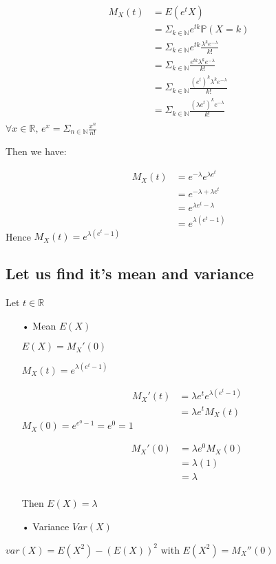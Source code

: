 \documentclass[11pt]{article}
\begin{document}
  
  \begin{align*}
M_X(t)&=E(e^tX)\\
	&=\Sigma_{k\in \mathbb{N}  }e^{tk}\mathbb{P}(X=k)  \\
	&=\Sigma_{k\in \mathbb{N}  }e^{tk}\frac{\lambda^{k} e^{-\lambda}}{k!}  \\
	&=\Sigma_{k\in \mathbb{N}  }\frac{e^{tk}\lambda^{k} e^{-\lambda}}{k!}  \\
	 &=\Sigma_{k\in \mathbb{N}  }\frac{(e^{t})^k\lambda^{k} e^{-\lambda}}{k!}  \\
	 &=\Sigma_{k\in \mathbb{N}  }\frac{(\lambda e^{t})^k e^{-\lambda}}{k!}  \\
\end{align*}
$\forall x \in \mathbb{R}\text{, } e^x= \Sigma_{n\in \mathbb{N}  }\frac{x^{n}}{n!}$

Then we have:

\begin{align*}
M_X(t)&=e^{-\lambda}e^{\lambda e^t}\\
	&=e^{-\lambda+\lambda e^t}\\
	&=e^{\lambda e^t-\lambda}\\
	&=e^{\lambda( e^t-1)}
\end{align*}
Hence $M_X(t)=e^{\lambda( e^t-1)}$
   
\subsection{Let us find it's mean and variance}

Let $t \in \mathbb{R}$
\begin{itemize}
\item[•]Mean $E(X)$

$E(X)=M_X'(0)$



$M_X(t)=e^{\lambda( e^t-1)}$

\begin{align*}
M_X'(t)&=\lambda e^{t}e^{\lambda( e^t-1)}\\
      &=\lambda e^{t}M_X(t)
\end{align*}
$M_X(0)=e^{e^{0}-1}=e^0=1$

\begin{align*}
M_X'(0)&=\lambda e^{0}M_X(0)\\
	   &=\lambda (1)\\
	   &=\lambda\\
\end{align*}

Then $E(X)=\lambda$

\item[•]Variance $Var(X)$
\end{itemize}
$var(X)=E(X^2)-(E(X))^2$ with $E(X^2)=M_X''(0)$
\end{document}
